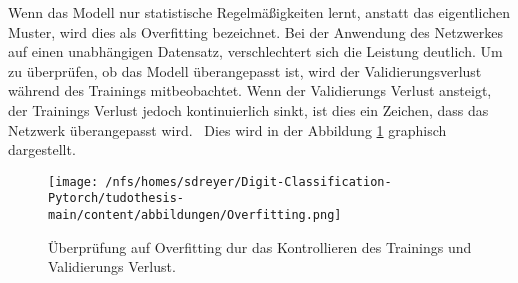 Wenn das Modell nur statistische Regelmäßigkeiten lernt, anstatt das eigentlichen Muster, wird dies als Overfitting bezeichnet.
Bei der Anwendung des Netzwerkes auf einen unabhängigen Datensatz, verschlechtert sich die Leistung deutlich. 
Um zu überprüfen, ob das Modell überangepasst ist, wird der Validierungsverlust während des Trainings mitbeobachtet.
Wenn der Validierungs Verlust ansteigt, der Trainings Verlust jedoch kontinuierlich sinkt, ist dies ein Zeichen, dass das Netzwerk überangepasst wird.~\cite{Yamashita2018}
Dies wird in der Abbildung \ref{fig:overfitting} graphisch dargestellt.
\begin{figure}[htbp]
  \centering
  \texttt{[image: /nfs/homes/sdreyer/Digit-Classification-Pytorch/tudothesis-main/content/abbildungen/Overfitting.png]}
  \caption{Überprüfung auf Overfitting dur das Kontrollieren des Trainings und Validierungs Verlust.~\cite{Yamashita2018}}
  \label{fig:overfitting}
\end{figure}
